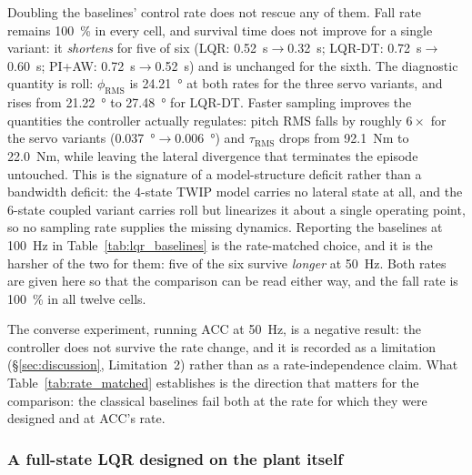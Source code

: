 \documentclass[conference]{IEEEtran}
\begin{document}
Doubling the baselines' control rate does not rescue any of them. Fall rate remains \SI{100}{\percent} in every cell, and survival time does not improve for a single variant: it \emph{shortens} for five of six (LQR: \SI{0.52}{s}$\rightarrow$\SI{0.32}{s}; LQR-DT: \SI{0.72}{s}$\rightarrow$\SI{0.60}{s}; PI+AW: \SI{0.72}{s}$\rightarrow$\SI{0.52}{s}) and is unchanged for the sixth. The diagnostic quantity is roll: $\phi_{\text{RMS}}$ is \SI{24.21}{\degree} at both rates for the three servo variants, and rises from \SI{21.22}{\degree} to \SI{27.48}{\degree} for LQR-DT. Faster sampling improves the quantities the controller actually regulates: pitch RMS falls by roughly $6{\times}$ for the servo variants (\SI{0.037}{\degree}$\rightarrow$\SI{0.006}{\degree}) and $\tau_{\text{RMS}}$ drops from \SI{92.1}{Nm} to \SI{22.0}{Nm}, while leaving the lateral divergence that terminates the episode untouched. This is the signature of a model-structure deficit rather than a bandwidth deficit: the 4-state TWIP model carries no lateral state at all, and the 6-state coupled variant carries roll but linearizes it about a single operating point, so no sampling rate supplies the missing dynamics. Reporting the baselines at \SI{100}{Hz} in Table~\ref{tab:lqr_baselines} is the rate-matched choice, and it is the harsher of the two for them: five of the six survive \emph{longer} at \SI{50}{Hz}. Both rates are given here so that the comparison can be read either way, and the fall rate is \SI{100}{\percent} in all twelve cells.

The converse experiment, running ACC at \SI{50}{Hz}, is a negative result: the controller does not survive the rate change, and it is recorded as a limitation (\S\ref{sec:discussion}, Limitation~2) rather than as a rate-independence claim. What Table~\ref{tab:rate_matched} establishes is the direction that matters for the comparison: the classical baselines fail both at the rate for which they were designed and at ACC's rate.

\subsubsection{A full-state LQR designed on the plant itself}
\label{sec:full_state_lqr}
\end{document}
